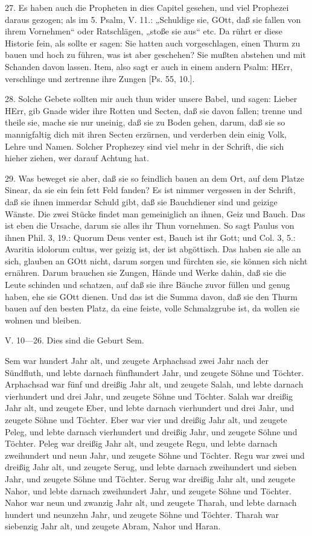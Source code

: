 27. Es haben auch die Propheten in dies Capitel gesehen, und viel Prophezei daraus gezogen; als im 5. Psalm, V. 11.: „Schuldige sie, GOtt, daß sie fallen von ihrem Vornehmen“ oder Ratschlägen, „stoße sie aus“ etc. Da rührt er diese Historie fein, als sollte er sagen: Sie hatten auch vorgeschlagen, einen Thurm zu bauen und hoch zu führen, was ist aber geschehen?
Sie mußten abstehen und mit Schanden davon lassen. Item, also sagt er auch in einem andern Psalm: HErr, verschlinge und zertrenne ihre Zungen [Ps. 55, 10.].

28. Solche Gebete sollten mir auch thun wider unsere Babel, und sagen: Lieber HErr, gib Gnade wider ihre Rotten und Secten, daß sie davon fallen; trenne und theile sie, mache sie nur uneinig, daß sie zu Boden gehen, darum, daß sie so mannigfaltig dich mit ihren Secten erzürnen, und verderben dein einig Volk, Lehre und Namen. Solcher Prophezey sind viel mehr in der Schrift, die sich hieher ziehen, wer darauf Achtung hat.

29. Was beweget sie aber, daß sie so feindlich bauen an dem Ort, auf dem Platze Sinear, da sie ein fein fett Feld fanden? Es ist nimmer vergessen in der Schrift, daß sie ihnen immerdar Schuld gibt, daß sie Bauchdiener sind und geizige Wänste. Die zwei Stücke findet man gemeiniglich an ihnen, Geiz und Bauch. Das ist eben die Ursache, darum sie alles ihr Thun vornehmen. So sagt Paulus von ihnen Phil. 3, 19.: Quorum Deus venter est, Bauch ist ihr Gott; und Col. 3, 5.: Avaritia idolorum cultus, wer geizig ist, der ist abgöttisch. Das haben sie alle an sich, glauben an GOtt nicht, darum sorgen und fürchten sie, sie können sich nicht ernähren. Darum brauchen sie Zungen, Hände und Werke dahin, daß sie die Leute schinden und schatzen, auf daß sie ihre Bäuche zuvor füllen und genug haben, ehe sie GOtt dienen. Und das ist die Summa davon, daß sie den Thurm bauen auf den besten Platz, da eine feiste, volle Schmalzgrube ist, da wollen sie wohnen und bleiben.

\begin{schriftzitat}
V. 10—26. Dies sind die Geburt Sem.

Sem war hundert Jahr alt, und zeugete Arphachsad zwei Jahr nach der Sündfluth, und lebte darnach fünfhundert Jahr, und zeugete Söhne und Töchter. Arphachsad war fünf und dreißig Jahr alt, und zeugete Salah, und lebte darnach vierhundert und drei Jahr, und zeugete Söhne und Töchter. Salah war dreißig Jahr alt, und zeugete Eber, und lebte darnach vierhundert und drei Jahr, und zeugete Söhne und Töchter. Eber war vier und dreißig Jahr alt, und zeugete Peleg, und lebte darnach vierhundert und dreißig Jahr, und zeugete Söhne und Töchter. Peleg war dreißig Jahr alt, und zeugete Regu, und lebte darnach zweihundert und neun Jahr, und zeugete Söhne und Töchter. Regu war zwei und dreißig Jahr alt, und zeugete Serug, und lebte darnach zweihundert und sieben Jahr, und zeugete Söhne und Töchter. Serug war dreißig Jahr alt, und zeugete Nahor, und lebte darnach zweihundert Jahr, und zeugete Söhne und Töchter. Nahor war neun und zwanzig Jahr alt, und zeugete Tharah, und lebte darnach hundert und neunzehn Jahr, und zeugete Söhne und Töchter. Tharah war siebenzig Jahr alt, und zeugete Abram, Nahor und Haran.
\end{schriftzitat}

